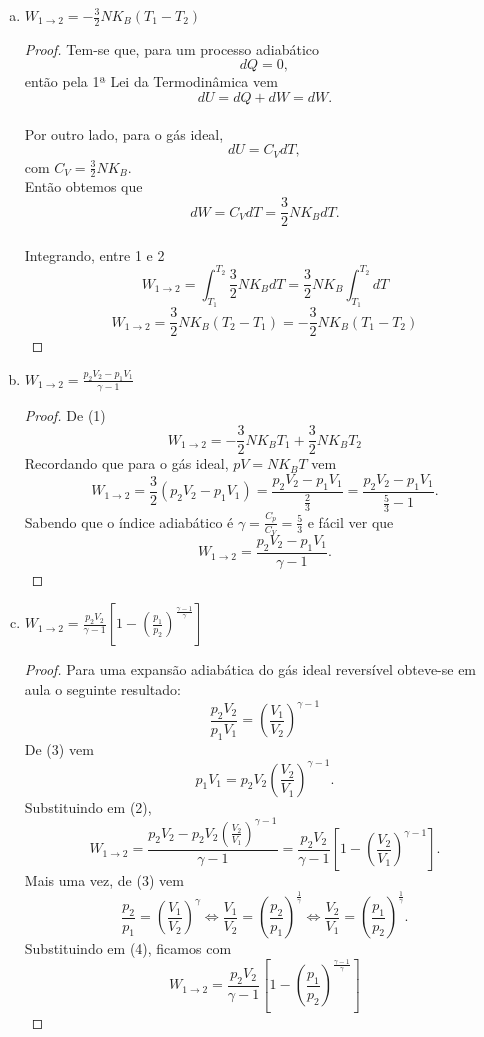 \documentclass[12pt, twoside, a4paper]{article}
\begin{document}
\begin{enumerate} [a)]
  \item $W_{1\rightarrow 2}=-\frac{3}{2}NK_B(T_1-T_2)$ \\
    \begin{proof}
      Tem-se que, para um processo adiabático $$dQ=0, $$ então pela 1ª Lei da Termodinâmica vem $$dU = dQ+ dW=dW. $$\\
      Por outro lado, para o gás ideal, $$dU=C_VdT,$$ com $C_V =\frac{3}{2}NK_B.$\\
      Então obtemos que $$dW=C_VdT=\frac{3}{2}NK_BdT. $$\\
      Integrando, entre 1 e 2
      $$W_{1\rightarrow2}= \int_{T_1}^{T_2}\frac{3}{2}NK_BdT=\frac{3}{2}NK_B\int_{T_1}^{T_2}dT $$
      \begin{equation}
        W_{1\rightarrow2}=\frac{3}{2}NK_B(T_2-T_1)=-\frac{3}{2}NK_B(T_1-T_2)
      \end{equation}
    \end{proof}

  \item $W_{1\rightarrow 2}=\frac{p_2V_2-p_1V_1}{\gamma-1}$ \\
    \begin{proof}
      De (1) $$W_{1\rightarrow2}=-\frac{3}{2}NK_BT_1+\frac{3}{2}NK_BT_2 $$
      Recordando que para o gás ideal, $pV=NK_BT$ vem
      $$W_{1\rightarrow2}=\frac{3}{2}(p_2V_2-p_1V_1)=\frac{p_2V_2-p_1V_1}{\frac{2}{3}}=\frac{p_2V_2-p_1V_1}{\frac{5}{3}-1}.$$
      Sabendo que o índice adiabático é $\gamma=\frac{C_p}{C_V}=\frac{5}{3}$ e fácil ver que
      \begin{equation}
        W_{1\rightarrow2}=\frac{p_2V_2-p_1V_1}{\gamma-1}.
      \end{equation}
    \end{proof}

  \item $W_{1\rightarrow 2}= \frac{p_2V_2}{\gamma-1}\left[1-\left(\frac{p_1}{p_2}\right)^{\frac{\gamma-1}{\gamma}}\right]$
    \begin{proof}
      Para uma expansão adiabática do gás ideal reversível obteve-se em aula o seguinte resultado:
      \begin{equation}
        \frac{p_2V_2}{p_1V_1}=\left(\frac{V_1}{V_2}\right)^{\gamma-1}
    \end{equation}
    De (3) vem $$p_1V_1=p_2V_2\left(\frac{V_2}{V_1}\right)^{\gamma-1}.$$ Substituindo em (2),
    \begin{equation}
      W_{1\rightarrow2}=\frac{p_2V_2-p_2V_2\left(\frac{V_2}{V_1}\right)^{\gamma-1}}{\gamma-1}=\frac{p_2V_2}{\gamma-1}\left[1-\left(\frac{V_2}{V_1}\right)^{\gamma-1}\right].
    \end{equation}
    Mais uma vez, de (3) vem
    $$\frac{p_2}{p_1}=\left(\frac{V_1}{V_2}\right)^{\gamma} \iff \frac{V_1}{V_2}=\left(\frac{p_2}{p_1}\right)^{\frac{1}{\gamma}} \iff \frac{V_2}{V_1}=\left(\frac{p_1}{p_2}\right)^{\frac{1}{\gamma}}.$$
    Substituindo em (4), ficamos com
    $$W_{1\rightarrow2}=\frac{p_2V_2}{\gamma-1}\left[1-\left(\frac{p_1}{p_2}\right)^{\frac{\gamma-1}{\gamma}}\right] $$
    \end{proof}
\end{enumerate}
\end{document}
